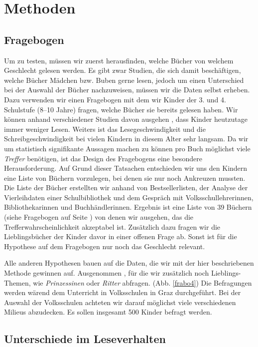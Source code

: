 \section{Methoden}

\subsection{Fragebogen}

Um  zu testen, müssen wir zuerst herausfinden, welche
Bücher von welchem Geschlecht gelesen werden. Es gibt zwar Studien, die
sich damit beschäftigen, welche Bücher Mädchen bzw. Buben gerne lesen,
jedoch um einen Unterschied bei der Auswahl der Bücher nachzuweisen,
müssen wir die Daten selbst erheben. Dazu verwenden wir einen Fragebogen
mit dem wir Kinder der 3. und 4. Schulstufe (8--10 Jahre) fragen, welche
Bücher sie bereits gelesen haben. Wir können anhand verschiedener
Studien davon ausgehen , dass Kinder heutzutage immer weniger Lesen.
Weiters ist das Lesegeschwindigkeit und die Schreibgeschwindigkeit bei
vielen Kindern in diesem Alter sehr langsam. Da wir um statistisch
signifikante Aussagen machen zu können pro Buch möglichst viele
\emph{Treffer} benötigen, ist das Design des Fragebogens eine besondere
Herausforderung. Auf Grund dieser Tatsachen entschieden wir uns den
Kindern eine Liste von Büchern vorzulegen, bei denen sie nur noch
Ankreuzen mussten. Die Liste der Bücher erstellten wir anhand von
Bestsellerlisten, der Analyse der Vierleihdaten einer Schulbibliothek
und dem Gespräch mit Volksschullehrerinnen, Bibliothekarinnen und
Buchhändlerinnen. Ergebnis ist eine Liste von 39 Büchern (siehe
Fragebogen auf Seite \pageref{frabo2}) von denen wir ausgehen, das die
Trefferwahrscheinlichkeit akzeptabel ist. Zusätzlich dazu fragen wir die
Lieblingsbücher der Kinder davor in einer offenen Frage ab. Sonst ist
für die Hypothese auf dem Fragebogen nur noch das Geschlecht relevant.

Alle anderen Hypothesen bauen auf die Daten, die wir mit der hier
beschriebenen Methode gewinnen auf. Ausgenommen , für
die wir zusätzlich noch Lieblings-Themen, wie \emph{Prinzessinen} oder
\emph{Ritter} abfragen. (Abb. \ref{frabo4}) Die Befragungen werden
wärend dem Unterricht in Volksschulen in Graz durchgeführt. Bei der
Auswahl der Volksschulen achteten wir darauf möglichst viele
verschiedenen Milieus abzudecken. Es sollen insgesamt 500 Kinder befragt
werden.

\subsection{Unterschiede im Leseverhalten}

